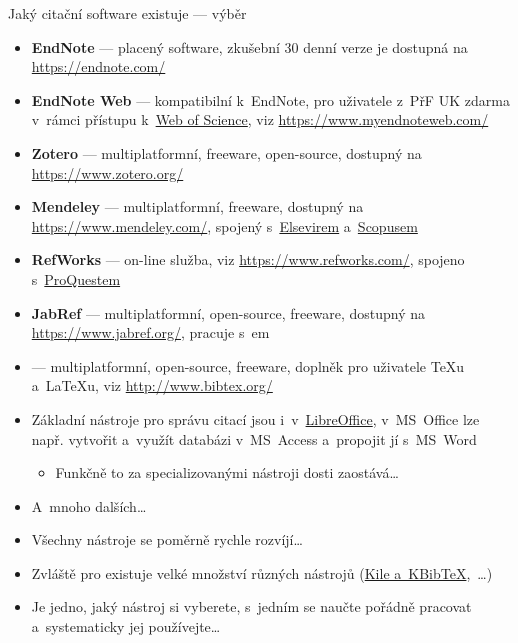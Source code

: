 \documentclass[compress, ucs, xelatex, xcolor=dvipsnames, print,
	hyperref={
		bookmarks=true,
		unicode=true,
		colorlinks=true,
		pdftitle={Citacni software},
		plainpages=false,
		pdfauthor={Vojtech Zeisek},
		pdfsubject={Kratky uvod do citacniho software},
		pdfcreator={XeLaTeX},
		pdfkeywords={citace, reference, software, literatura},
		linkcolor=Red,
		anchorcolor=Red,
		citecolor=Green,
		filecolor=Magenta,
		menucolor=Green,
		urlcolor=Cyan,
		pdftex},
	url={hyphens, lowtilde} %
	]{beamer}
\begin{document}
\begin{frame}[allowframebreaks]{Jaký citační software existuje --- výběr}
	\begin{itemize}
		\item \textbf{EndNote} --- placený software, zkušební 30 denní verze je dostupná na \url{https://endnote.com/}
		\item \textbf{EndNote Web} --- kompatibilní k~EndNote, pro uživatele z~PřF UK zdarma v~rámci přístupu k~\href{https://apps.webofknowledge.com/}{Web of Science}, viz \url{https://www.myendnoteweb.com/}
		\item \textbf{Zotero} --- multiplatformní, freeware, open-source, dostupný na \url{https://www.zotero.org/}
		\item \textbf{Mendeley} --- multiplatformní, freeware, dostupný na \url{https://www.mendeley.com/}, spojený s~\href{https://www.elsevier.com/}{Elsevirem}  a~\href{https://www.scopus.com/}{Scopusem}
		\item \textbf{RefWorks} --- on-line služba, viz \url{https://www.refworks.com/}, spojeno s~\href{https://www.proquest.com/}{ProQuestem}
		\item \textbf{JabRef} --- multiplatformní, open-source, freeware, dostupný na \url{https://www.jabref.org/}, pracuje s~\BibTeX em
		\item \textbf{\BibTeX} --- multiplatformní, open-source, freeware, doplněk pro uživatele \TeX u a~\LaTeX u, viz \url{http://www.bibtex.org/}
		\item Základní nástroje pro správu citací jsou i~v~\href{https://www.openoffice.cz/navody/jak-vytvorit-a-upravovat-seznam-pouzite-literatury}{LibreOffice}, v~MS~Office lze např. vytvořit a~využít databázi v~MS~Access a~propojit jí s~MS~Word
		\begin{itemize}
			\item Funkčně to za specializovanými nástroji dosti zaostává\ldots
		\end{itemize}
		\item A~mnoho dalších\ldots
		\item Všechny nástroje se poměrně rychle rozvíjí\ldots
		\item Zvláště pro \BibTeX existuje velké množství různých nástrojů (\href{https://www.linuxexpres.cz/software/kile-a-kbibtex}{Kile a~KBibTeX},~\ldots)
		\item Je jedno, jaký nástroj si vyberete, s~jedním se naučte pořádně pracovat a~systematicky jej používejte\ldots
	\end{itemize}
\end{frame}
\end{document}
